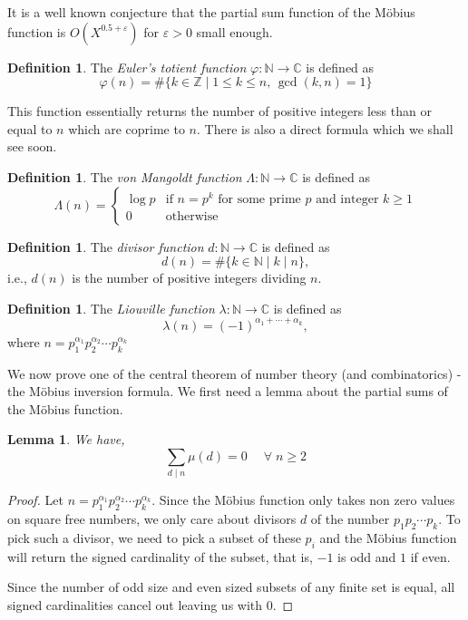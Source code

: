 \documentclass[10pt,openany]{book}
\newtheorem{lemma}[theorem]{Lemma}
\theoremstyle{italicnonumber}
\theoremstyle{definition}
\newtheorem{definition}[theorem]{Definition}
\let\oldforall\forall
\renewcommand{\forall}{\;\oldforall\;}
\newcommand{\bC}{\mathbb{C}}
\begin{document}
It is a well known conjecture that the partial sum function of the Möbius function is $O(X^{0.5+\varepsilon})$ for $\varepsilon > 0$ small enough.

\begin{definition} \label{eu_tot}
  The \textit{Euler's totient function} $\varphi : \mathbb{N} \to \bC$ is defined as
  \[
    \varphi(n) = \#\{k \in \mathbb{Z} \mid 1 \leq k \leq n, \, \gcd(k, n) = 1\}
  \]
\end{definition}

This function essentially returns the number of positive integers less than or equal to $n$ which are coprime to $n$. There is also a direct formula which we shall see soon.

\begin{definition}
  The \textit{von Mangoldt function} $\Lambda : \mathbb{N} \to \bC$ is defined as
  \[
    \Lambda(n) = 
    \begin{cases}
      \log p & \text{if } n = p^k \text{ for some prime } p \text{ and integer } k \ge 1 \\
      0 & \text{otherwise}
    \end{cases}
  \]
\end{definition}

\begin{definition}
  The \textit{divisor function} \( d : \mathbb{N} \to \bC \) is defined as
  \[
    d(n) = \#\{k \in \mathbb{N} \mid k \mid n\},
  \]
  i.e., \( d(n) \) is the number of positive integers dividing \( n \).
\end{definition}

\begin{definition}
  The \textit{Liouville function} \( \lambda : \mathbb{N} \to \bC \) is defined as
  \[
    \lambda(n) = (-1)^{\alpha_1 + \cdots + \alpha_k},
  \]
  where $n = p_1^{\alpha_1} p_2^{\alpha_2} \cdots p_k^{\alpha_k}$
\end{definition}

We now prove one of the central theorem of number theory (and combinatorics) - the Möbius inversion formula. We first need a lemma about the partial sums of the Möbius function.

\begin{lemma} \label{mob_lemma}
  We have,
  \[
  \sum_{d \mid n} \mu(d) = 0 \quad \forall n \geq 2
  \]
\end{lemma}

\begin{proof}
  Let $n=p_1^{\alpha_1} p_2^{\alpha_2} \cdots p_k^{\alpha_k}$. Since the Möbius function only takes non zero values on square free numbers, we only care about divisors $d$ of the number $p_1p_2 \cdots p_k$. To pick such a divisor, we need to pick a subset of these $p_i$ and the Möbius function will return the signed cardinality of the subset, that is, $-1$ is odd and $1$ if even.

  Since the number of odd size and even sized subsets of any finite set is equal, all signed cardinalities cancel out leaving us with 0.
\end{proof}
\end{document}
